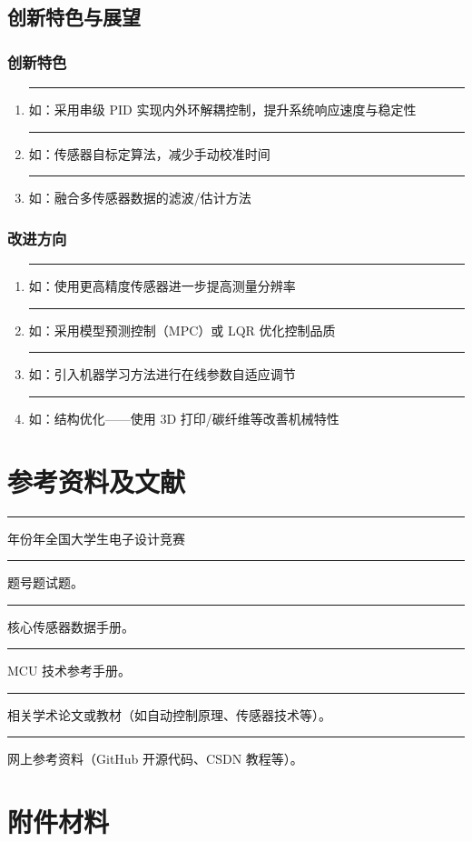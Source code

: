 \documentclass[12pt,a4paper,fontset=fandol]{ctexart}
\newcommand{\blank}{\rule{4cm}{0.4pt}}
\begin{document}
\subsection{创新特色与展望}
\subsubsection*{创新特色}
\begin{enumerate}
  \item \blank{如：采用串级 PID 实现内外环解耦控制，提升系统响应速度与稳定性}
  \item \blank{如：传感器自标定算法，减少手动校准时间}
  \item \blank{如：融合多传感器数据的滤波/估计方法}
\end{enumerate}

\subsubsection*{改进方向}
\begin{enumerate}
  \item \blank{如：使用更高精度传感器进一步提高测量分辨率}
  \item \blank{如：采用模型预测控制（MPC）或 LQR 优化控制品质}
  \item \blank{如：引入机器学习方法进行在线参数自适应调节}
  \item \blank{如：结构优化——使用 3D 打印/碳纤维等改善机械特性}
\end{enumerate}

\section{参考资料及文献}
\begin{enumerate}[label={[\arabic*]}]
  \item \blank{年份}年全国大学生电子设计竞赛\blank{题号}题试题。
  \item \blank{核心传感器数据手册}。
  \item \blank{MCU 技术参考手册}。
  \item \blank{相关学术论文或教材（如自动控制原理、传感器技术等）}。
  \item \blank{网上参考资料（GitHub 开源代码、CSDN 教程等）}。
\end{enumerate}

\section{附件材料}
\end{document}
